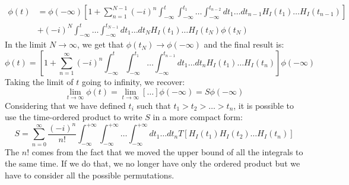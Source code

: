 \documentclass[../main.tex]{subfiles}
\begin{document}
\begin{align*}
\phi(t)&=\phi(-\infty)\left[1+\sum_{n=1}^{N-1}(-i)^n\int_{-\infty}^t\int_{-\infty}^{t_1}\dots\int_{-\infty}^{t_{n-2}}dt_1\dots dt_{n-1}H_I(t_1)\dots H_I(t_{n-1})\right]\\
&+(-i)^N\int_{-\infty}^t\dots\int_{-\infty}^{t_{N-1}}dt_1\dots dt_NH_I(t_1)\dots H_I(t_N)\phi(t_N)
\end{align*}
In the limit $N\to\infty$, we get that $\phi(t_N)\to\phi(-\infty)$ and the final result is:
\[
\phi(t)=\left[1+\sum_{n=1}^\infty(-i)^n\int_{-\infty}^t\int_{-\infty}^{t_1}\dots\int_{-\infty}^{t_{n-1}}dt_1\dots dt_nH_I(t_1)\dots H_I(t_n)\right]\phi(-\infty)
\]
Taking the limit of $t$ going to infinity, we recover:
\[
\lim_{t\to\infty}\phi(t)=\lim_{t\to\infty}[\dots]\phi(-\infty)=S\phi(-\infty)
\]
Considering that we have defined $t_i$ such that $t_1>t_2>\dots>t_n$, it is possible to use the time-ordered product to write $S$ in a more compact form:
\[
S=\sum_{n=0}^\infty\frac{(-i)^n}{n!}\int_{-\infty}^{+\infty}\int_{-\infty}^{+\infty}\dots\int_{-\infty}^{+\infty}dt_1\dots dt_nT[H_I(t_1)H_I(t_2)\dots H_I(t_n)]
\]
The $n!$ comes from the fact that we moved the upper bound of all the integrals to the same time. If we do that, we no longer have only the ordered product but we have to consider all the possible permutations.
\end{document}
